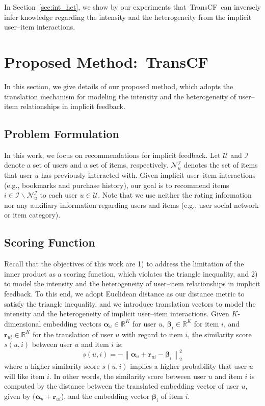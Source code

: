 \documentclass[conference]{IEEEtran}
\newcommand{\norm}[1]{\left\lVert#1\right\rVert}
\newcommand{\propose}{\textsf{{TransCF}}}
\begin{document}
In Section~\ref{sec:int_het}, we show by our experiments that~\propose~can inversely infer knowledge regarding the intensity and the heterogeneity from the implicit user--item interactions.


\section{Proposed Method:~\textsf{T}\lowercase{\textsf{rans}}\textsf{CF}}
In this section, we give details of our proposed method, which adopts the translation mechanism for modeling the intensity and the heterogeneity of user--item relationships in implicit feedback.

\subsection{Problem Formulation}
In this work, we focus on recommendations for implicit feedback. 
Let $\mathcal{U}$ and $\mathcal{I}$ denote a set of users and a set of items, respectively.
$\mathcal{N}^\mathcal{I}_u$ denotes the set of items that user $u$ has previously interacted with.
Given implicit user--item interactions (e.g., bookmarks and purchase history), our goal is to recommend items $i\in\mathcal{I}\backslash \mathcal{N}^\mathcal{I}_u$ to each user $u\in\mathcal{U}$. Note that we use neither the rating information nor any auxiliary information regarding users and items (e.g., user social network or item category). 



\subsection{Scoring Function}
Recall that the objectives of this work are 1) to address the limitation of the inner product as a scoring function, which violates the triangle inequality, and 2) to model the intensity and the heterogeneity of user--item relationships in implicit feedback. To this end, we adopt Euclidean distance as our distance metric to satisfy the triangle inequality, and we introduce translation vectors to model the intensity and the heterogeneity of implicit user--item interactions. Given $K$-dimensional embedding vectors $\bm{\alpha}_u\in\mathbb{R}^K$ for user $u$, $\bm{\beta}_i\in\mathbb{R}^K$ for item $i$, and $\bm{r}_{ui}\in\mathbb{R}^K$ for the translation of user $u$ with regard to item $i$, the similarity score $s(u,i)$ between user $u$ and item $i$ is:
\begin{equation}
\label{eqn:score}
	s(u,i) = -\norm{\bm{\alpha}_u + \bm{r}_{ui} - {\bm{\beta}_i}}_2^2
\end{equation}	
where a higher similarity score $s(u,i)$ implies a higher probability that user $u$ will like item $i$.
In other words, the similarity score between user $u$ and item $i$ is computed by the distance between the translated embedding vector of user $u$, given by ($\bm{\alpha}_u+\bm{r}_{ui}$), and the embedding vector $\bm{\beta}_i$ of item $i$.
\end{document}
